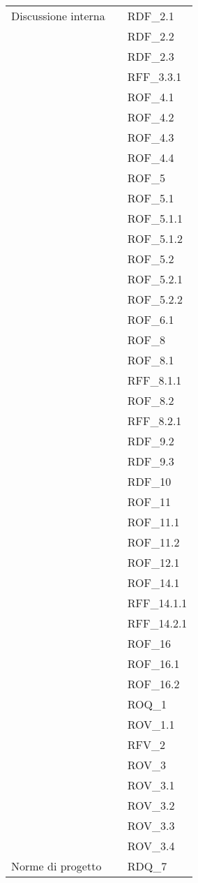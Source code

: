 \begin{xltabular}{\textwidth}{ p{0.3\textwidth} | X | p{0.2\textwidth} }
    
    Discussione interna & & RDF\_2.1\\ 
    &&RDF\_2.2\\ 
    &&RDF\_2.3\\ 
    &&RFF\_3.3.1\\ 
    &&ROF\_4.1\\ 
    &&ROF\_4.2\\ 
    &&ROF\_4.3\\ 
    &&ROF\_4.4\\ 
    &&ROF\_5\\ 
    &&ROF\_5.1\\ 
    &&ROF\_5.1.1\\ 
    &&ROF\_5.1.2\\ 
    &&ROF\_5.2\\ 
    &&ROF\_5.2.1\\ 
    &&ROF\_5.2.2\\ 
    &&ROF\_6.1\\ 
    &&ROF\_8\\ 
    &&ROF\_8.1\\ 
    &&RFF\_8.1.1\\ 
    &&ROF\_8.2\\ 
    &&RFF\_8.2.1\\ 
    &&RDF\_9.2\\ 
    &&RDF\_9.3\\ 
    &&RDF\_10\\ 
    &&ROF\_11\\ 
    &&ROF\_11.1\\ 
    &&ROF\_11.2\\ 
    &&ROF\_12.1\\ 
    &&ROF\_14.1\\ 
    &&RFF\_14.1.1\\ 
    &&RFF\_14.2.1\\ 
    &&ROF\_16\\ 
    &&ROF\_16.1\\ 
    &&ROF\_16.2\\ 
    &&ROQ\_1\\ 
    &&ROV\_1.1\\ 
    &&RFV\_2\\ 
    &&ROV\_3\\ 
    &&ROV\_3.1\\ 
    &&ROV\_3.2\\ 
    &&ROV\_3.3\\ 
    &&ROV\_3.4\\ 


    Norme di progetto & & RDQ\_7\\



\end{xltabular}
